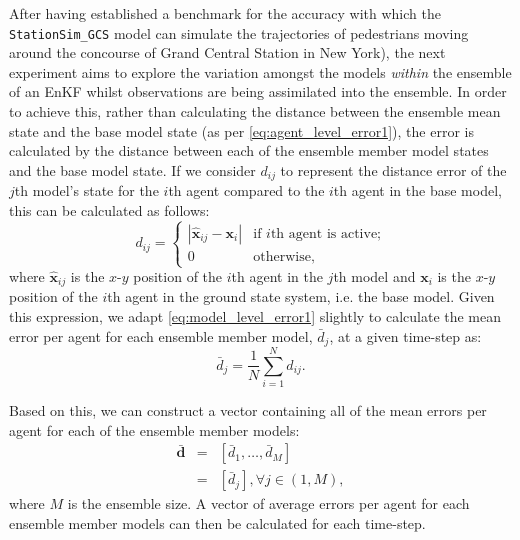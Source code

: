 \documentclass{article}
\begin{document}
After having established a benchmark for the accuracy with which the \texttt{StationSim\_GCS} model can simulate the trajectories of pedestrians moving around the concourse of Grand Central Station in New York), the next experiment aims to explore the variation amongst the models \textit{within} the ensemble of an EnKF whilst observations are being assimilated into the ensemble.  
In order to achieve this, rather than calculating the distance between the ensemble mean state and the base model state (as per \eqref{eq:agent_level_error1}), the error is calculated by the distance between each of the ensemble member model states and the base model state.  If we consider $d_{ij}$ to represent the distance error of the $j$th model's state for the $i$th agent compared to the $i$th agent in the base model, this can be calculated as follows:
\begin{equation}
	d_{ij} = 
	\begin{cases}
		| \hat{\mathbf{x}}_{ij} - \mathbf{x}_i | & \text{if $i$th agent is
			active;}\\
		0 & \text{otherwise,}
	\end{cases}
    \label{eq:agentl_level_error2}
\end{equation}
where $\hat{\mathbf{x}}_{ij}$ is the $x$-$y$ position of the $i$th agent in the $j$th model and $\mathbf{x}_i$ is the $x$-$y$ position of the $i$th agent in the ground state system, i.e. the base model. Given this expression, we adapt \eqref{eq:model_level_error1} slightly to calculate the mean error per agent for each ensemble member model, $\bar{d}_j$, at a given time-step as:
\begin{equation}
	\bar{d}_j = \frac{1}{N} \sum_{i=1}^{N} d_{ij} .
    \label{eq:model_level_error2}
\end{equation}

Based on this, we can construct a vector containing all of the mean errors per agent for each of the ensemble member models:
\begin{eqnarray}
	\bar{\mathbf{d}} &=& \left[ \bar{d}_1, \ldots, \bar{d}_M \right] \\
	&=& \left[ \bar{d}_j  \right], \forall j \in (1, M),
\end{eqnarray}
where $M$ is the ensemble size.
A vector of average errors per agent for each ensemble member models can then be calculated for each time-step.
\end{document}
